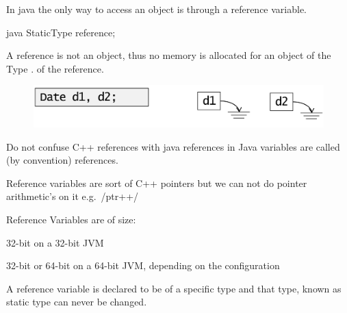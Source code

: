 \begin{defnbox}\nospacing
  \begin{defn}\label{defn:referenceVariable}
    In java the only way to access an object is through a reference variable.
    \begin{mintlinebox}{java}
      StaticType reference;
    \end{mintlinebox}
    A reference is not an object, thus no memory is allocated for an object of
    the Type .
    of the reference.
    \begin{figure}[H]
      \vspace{-5pt}
      \centering
      \includegraphics[width=.7\textwidth]{java/figures/basics/reference.png}
    \end{figure}
  \end{defn}
\end{defnbox}
\begin{notebox}[Note]\nospacing
  \begin{itemizenosep}
      \item Do not confuse C++ references with java references in Java variables are
  called (by convention) references.
      \item Reference variables are sort of C++ pointers but we can not do
    pointer arithmetic's on it e.g.\ \cppinline/ptr++/
      \item Reference Variables are of size:
    \begin{itemizenosep}
        \item 32-bit on a 32-bit JVM
        \item 32-bit or 64-bit on a 64-bit JVM, depending on the configuration
    \end{itemizenosep}
  \end{itemizenosep}
\end{notebox}
\begin{defnbox}\nospacing
  \begin{defn}\leavevmode
    A reference variable is declared to be of a specific type and that type,
    known as static type can never be changed.\leavevmode\\
  \end{defn}
\end{defnbox}

